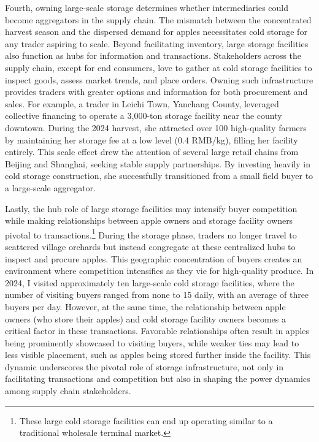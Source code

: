 Fourth, owning large-scale storage determines whether intermediaries could become aggregators in the supply chain. The mismatch between the concentrated harvest season and the dispersed demand for apples necessitates cold storage for any trader aspiring to scale. Beyond facilitating inventory, large storage facilities also function as hubs for information and transactions. Stakeholders across the supply chain, except for end consumers, love to gather at cold storage facilities to inspect goods, assess market trends, and place orders. Owning such infrastructure provides traders with greater options and information for both procurement and sales. For example, a trader in Leichi Town, Yanchang County, leveraged collective financing to operate a 3,000-ton storage facility near the county downtown. During the 2024 harvest, she attracted over 100 high-quality farmers by maintaining her storage fee at a low level (0.4 RMB/kg), filling her facility entirely. This scale effect drew the attention of several large retail chains from Beijing and Shanghai, seeking stable supply partnerships. By investing heavily in cold storage construction, she successfully transitioned from a small field buyer to a large-scale aggregator.



Lastly, the hub role of large storage facilities may intensify buyer competition while making relationships between apple owners and storage facility owners pivotal to transactions.\footnote{These large cold storage facilities can end up operating similar to a traditional wholesale terminal market.} During the storage phase, traders no longer travel to scattered village orchards but instead congregate at these centralized hubs to inspect and procure apples. This geographic concentration of buyers creates an environment where competition intensifies as they vie for high-quality produce. In 2024, I visited approximately ten large-scale cold storage facilities, where the number of visiting buyers ranged from none to 15 daily, with an average of three buyers per day. However, at the same time, the relationship between apple owners (who store their apples) and cold storage facility owners becomes a critical factor in these transactions. Favorable relationships often result in apples being prominently showcased to visiting buyers, while weaker ties may lead to less visible placement, such as apples being stored further inside the facility. This dynamic underscores the pivotal role of storage infrastructure, not only in facilitating transactions and competition but also in shaping the power dynamics among supply chain stakeholders.



